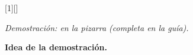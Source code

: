   \newcommand{\lamina}[1]{\clearpage\gdef\titulolamina{#1}\markright{#1}\barralamina{#1}}
  \newcommand{\saltolamina}{\clearpage\barralamina{\titulolamina\ {\normalfont\small(cont.)}}}
  \newcommand{\agregarnecesita}[1]{\BeforeBeginEnvironment{#1}{\needspace{5\baselineskip}}}
  [1][]{\par\smallskip\noindent
    \ifx\esbozoactual\empty
      {\color{gris}\small\itshape Demostración: en la pizarra (completa en la guía).}%
    \else
      {\setlength{\fboxsep}{4pt}\colorbox{grisclaro}{\parbox{\dimexpr\linewidth-2\fboxsep}{%
        \small{\color{azul}\bfseries Idea de la demostración.}\ \esbozoactual}}}%
    \fi
    \gdef\esbozoactual{}\par\smallskip}
\else
  \newcommand{\sologuia}[1]{#1}
  \newcommand{\soloproyeccion}[1]{}
  \newcommand{\bloque}[4]{%
    \ifnum#2=1 \immediate\openout\archivobloques=\jobname-bloques.tex\fi
    \immediate\write\archivobloques{\string\iniciobloque{#2}{\the\value{proposicion}}%
      {\the\value{equation}}{\the\value{figure}}}%
    \needspace{10\baselineskip}%
    \section*{Bloque #2 \textperiodcentered\ #3}%
    \addcontentsline{toc}{section}{Bloque #2 \textperiodcentered\ #3}%
    {\color{gris}\small #4}\par\smallskip}
  \newcommand{\lamina}[1]{\needspace{6\baselineskip}\subsection*{#1}\gdef\titulolamina{#1}}
  \newcommand{\saltolamina}{}
\fi
\providecommand{\sesiontitulo}{}
